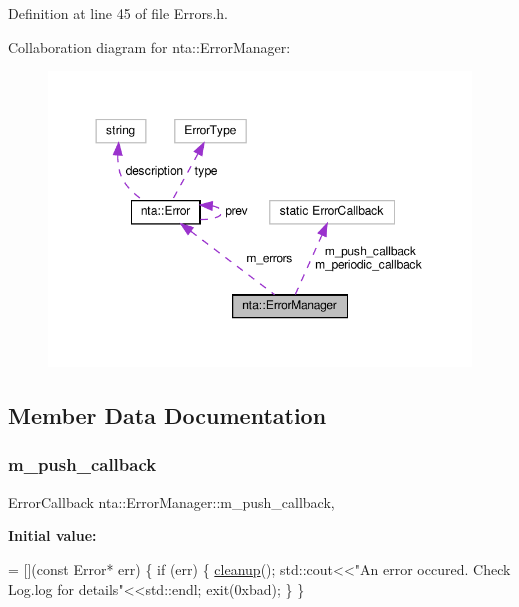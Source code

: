 Definition at line 45 of file Errors.\+h.



Collaboration diagram for nta\+:\+:Error\+Manager\+:\nopagebreak
\begin{figure}[H]
\begin{center}
\leavevmode
\includegraphics[width=350pt]{d5/d79/classnta_1_1ErrorManager__coll__graph}
\end{center}
\end{figure}


\subsection{Member Data Documentation}
\mbox{\label{classnta_1_1ErrorManager_a96ac1ed4fb4ee3dd2ca4c055ccfc630c}} 
\subsubsection{\texorpdfstring{m\+\_\+push\+\_\+callback}{m\_push\_callback}}
{\footnotesize\ttfamily Error\+Callback nta\+::\+Error\+Manager\+::m\+\_\+push\+\_\+callback\hspace{0.3cm}{\ttfamily [static]}, {\ttfamily [private]}}

{\bfseries Initial value\+:}
\begin{DoxyCode}
= [](\textcolor{keyword}{const} Error* err) \{
        \textcolor{keywordflow}{if} (err) \{
            \hyperlink{namespacenta_a17dc16b021d0dec3749e422b95d39350}{cleanup}();
            std::cout<<\textcolor{stringliteral}{"An error occured. Check Log.log for details"}<<std::endl;
            exit(0xbad);
        \}
    \}
\end{DoxyCode}


